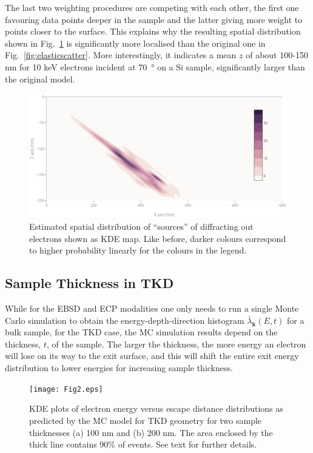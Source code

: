The last two weighting procedures are competing with each other, the first one favouring data points deeper in the sample and the latter giving more weight to points closer to the surface. This explains why the resulting spatial distribution shown in Fig.~\ref{fig:last_weight} is significantly more localised than the original one in Fig.~\ref{fig:elasticscatter}. More interestingly, it indicates a mean $z$ of about 100-150 nm for 10 keV electrons incident at \SI{70}{\degree} on a Si sample, significantly larger than the original model.  

\begin{figure}[ht]
\centering
\includegraphics[width=5.8in]{Figures/last_weight.png}
\caption[Estimated spatial distribution of diffraction out ``sources''.]{Estimated spatial distribution of ``sources'' of diffracting out electrons shown as KDE map. Like before, darker colours correspond to higher probability linearly for the colours in the legend.  }
\label{fig:last_weight}
\end{figure}




%
\subsection{Sample Thickness in TKD}
\label{sec:TKDthickness}
While for the EBSD and ECP modalities one only needs to run a single Monte Carlo simulation to obtain the energy-depth-direction histogram $\bar{\lambda}_{\mathbf{k}}(E,t)$ for a bulk sample, for the TKD case, the MC simulation results depend on the thickness, $t$, of the sample.
The larger the thickness, the more energy an electron will lose on its way to the exit surface, and this will shift the entire exit energy distribution to lower energies for increasing sample thickness. 




\begin{figure}[ht]
\centering
\texttt{[image: Fig2.eps]}%
\caption[KDE plots of electron energy versus escape distance distributions]{KDE plots of electron energy versus escape distance distributions as predicted by the MC model for TKD geometry for two sample thicknesses (a) 100 nm and (b) 200 nm. The area enclosed by the thick line contains 90$\%$ of events. See text for further details. }
\label{fig:E_z_KDE}
\end{figure}

